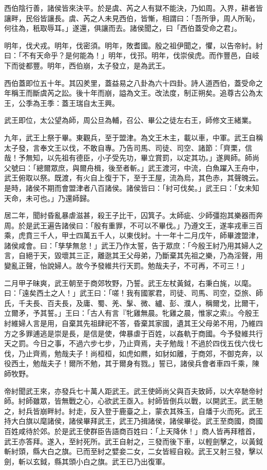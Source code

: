 \begin{pinyinscope}
西伯陰行善，諸侯皆來決平。於是虞、芮之人有獄不能決，乃如周。入界，耕者皆讓畔，民俗皆讓長。虞、芮之人未見西伯，皆慚，相謂曰：「吾所爭，周人所恥，何往為，秖取辱耳。」遂還，俱讓而去。諸侯聞之，曰「西伯蓋受命之君」。

明年，伐犬戎。明年，伐密須。明年，敗耆國。殷之祖伊聞之，懼，以告帝紂。紂曰：「不有天命乎？是何能為！」明年，伐邘。明年，伐崇侯虎。而作豐邑，自岐下而徙都豐。明年，西伯崩，太子發立，是為武王。

西伯蓋即位五十年。其囚羑里，蓋益易之八卦為六十四卦。詩人道西伯，蓋受命之年稱王而斷虞芮之訟。後十年而崩，謚為文王。改法度，制正朔矣。追尊古公為太王，公季為王季：蓋王瑞自太王興。

武王即位，太公望為師，周公旦為輔，召公、畢公之徒左右王，師修文王緒業。

九年，武王上祭于畢。東觀兵，至于盟津。為文王木主，載以車，中軍。武王自稱太子發，言奉文王以伐，不敢自專。乃告司馬、司徒、司空、諸節：「齊栗，信哉！予無知，以先祖有德臣，小子受先功，畢立賞罰，以定其功。」遂興師。師尚父號曰：「總爾眾庶，與爾舟楫，後至者斬。」武王渡河，中流，白魚躍入王舟中，武王俯取以祭。既渡，有火自上復于下，至于王屋，流為烏，其色赤，其聲魄云。是時，諸侯不期而會盟津者八百諸侯。諸侯皆曰：「紂可伐矣。」武王曰：「女未知天命，未可也。」乃還師歸。

居二年，聞紂昏亂暴虐滋甚，殺王子比干，囚箕子。太師疵、少師彊抱其樂器而奔周。於是武王遍告諸侯曰：「殷有重罪，不可以不畢伐。」乃遵文王，遂率戎車三百乘，虎賁三千人，甲士四萬五千人，以東伐紂。十一年十二月戊午，師畢渡盟津，諸侯咸會。曰：「孳孳無怠！」武王乃作太誓，告于眾庶：「今殷王紂乃用其婦人之言，自絕于天，毀壞其三正，離逖其王父母弟，乃斷棄其先祖之樂，乃為淫聲，用變亂正聲，怡說婦人。故今予發維共行天罰。勉哉夫子，不可再，不可三！」

二月甲子昧爽，武王朝至于商郊牧野，乃誓。武王左杖黃鉞，右秉白旄，以麾。曰：「遠矣西土之人！」武王曰：「嗟！我有國冢君，司徒、司馬、司空，亞旅、師氏，千夫長、百夫長，及庸、蜀、羌、髳、微、纑、彭、濮人，稱爾戈，比爾干，立爾矛，予其誓。」王曰：「古人有言『牝雞無晨。牝雞之晨，惟家之索』。今殷王紂維婦人言是用，自棄其先祖肆祀不答，昏棄其家國，遺其王父母弟不用，乃維四方之多罪逋逃是崇是長，是信是使，俾暴虐于百姓，以姦軌于商國。今予發維共行天之罰。今日之事，不過六步七步，乃止齊焉，夫子勉哉！不過於四伐五伐六伐七伐，乃止齊焉，勉哉夫子！尚桓桓，如虎如羆，如豺如離，于商郊，不御克奔，以役西土，勉哉夫子！爾所不勉，其于爾身有戮。」誓已，諸侯兵會者車四千乘，陳師牧野。

帝紂聞武王來，亦發兵七十萬人距武王。武王使師尚父與百夫致師，以大卒馳帝紂師。紂師雖眾，皆無戰之心，心欲武王亟入。紂師皆倒兵以戰，以開武王。武王馳之，紂兵皆崩畔紂。紂走，反入登于鹿臺之上，蒙衣其殊玉，自燔于火而死。武王持大白旗以麾諸侯，諸侯畢拜武王，武王乃揖諸侯，諸侯畢從。武王至商國，商國百姓咸待於郊。於是武王使群臣告語商百姓曰：「上天降休！」商人皆再拜稽首，武王亦答拜。遂入，至紂死所。武王自射之，三發而後下車，以輕劍擊之，以黃鉞斬紂頭，縣大白之旗。已而至紂之嬖妾二女，二女皆經自殺。武王又射三發，擊以劍，斬以玄鉞，縣其頭小白之旗。武王已乃出復軍。


\end{pinyinscope}
